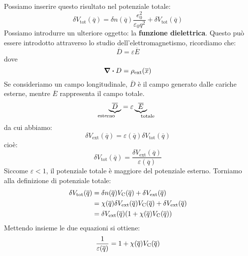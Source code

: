 Possiamo inserire questo risultato nel potenziale totale:
\begin{equation*}
    \delta V_{\text{tot}}(\overline q)=\delta n(\overline q)\frac{e_0^2}{\varepsilon_0q^2}+\delta V_{\text{tot}}(\overline q)
\end{equation*}
Possiamo introdurre un ulteriore oggetto: la \textbf{funzione dielettrica}. Questo può essere introdotto attraverso lo studio dell'elettromagnetismo, ricordiamo che:
\begin{equation*}
    \overline D = \varepsilon \overline E
\end{equation*}
dove
\begin{equation*}
    \divergence{D}=\rho_{\text{ext}}(\overline x)
\end{equation*}
Se consideriamo un campo longitudinale, $\overline D$ è il campo generato dalle cariche esterne, mentre $\overline E$ rappresenta il campo totale.
\begin{equation*}
    \underbrace{\overline D}_{\mathllap{\text{esterno}}} = \varepsilon \underbrace{\overline E}_{\mathrlap{\text{totale}}}
\end{equation*}
da cui abbiamo:
\begin{equation*}
    \delta V_{\text{ext}}(\overline q) = \varepsilon(\overline q)\delta V_{\text{tot}}(\overline q)
\end{equation*}
cioè:
\begin{equation*}
    \delta V_{\text{tot}}(\overline q) = \frac{\delta V_{\text{ext}}(\overline q)}{\varepsilon(\overline q)}
\end{equation*}
Siccome $\varepsilon < 1$, il potenziale totale è maggiore del potenziale esterno. Torniamo alla definizione di potenziale totale:
\begin{equation*}
    \begin{aligned}
        \delta V_{\text{tot}}(\overline q) & =\delta n(\overline q)V_{\text C}(\overline q)+\delta V_{\text{ext}}(\overline q) \\
        & = \chi(\overline q)\delta V_{\text{ext}}(\overline q)V_{\text C}(\overline q)+\delta V_{\text{ext}}(\overline q) \\
        & = \delta V_{\text{ext}}(\overline q)(1+\chi(\overline q)V_{\text C}(\overline q))
    \end{aligned}
\end{equation*}
Mettendo insieme le due equazioni si ottiene:
\begin{equation*}
    \frac{1}{\varepsilon(\overline q)}=1+\chi(\overline q)V_{\text C}(\overline q)
\end{equation*}


